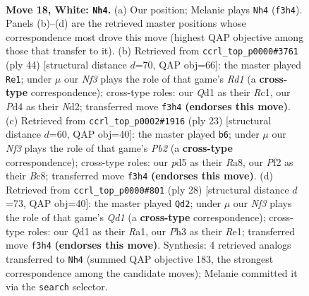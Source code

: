 \documentclass[11pt]{article}
\begin{document}
\clearpage

\begin{figure}[p]\centering
\begin{subfigure}{0.46\textwidth}\centering
\resizebox{\linewidth}{!}{%
\newchessgame
\chessboard[
  setfen={rnq1r1k1/pp1bbppp/4pn2/2Pp4/N2P4/P4N1P/1P1B1PP1/1BRQR1K1 w - - 1 18},
  showmover=false,
  pgfstyle=straightmove, color=movearrow, markmove={f3-h4}
]}
\caption{}
\end{subfigure}\hfill
\begin{subfigure}{0.46\textwidth}\centering
\resizebox{\linewidth}{!}{%
\newchessgame
\chessboard[
  setfen={2r1r1k1/1bqnbpp1/pp1p1n1p/4p3/P3P2P/2N1B1P1/1PPNQPB1/2RR2K1 w - - 9 23},
  showmover=false,
  pgfstyle=straightmove, color=movearrow, markmove={d1-e1}
]}
\caption{}
\end{subfigure}
\\[4pt]
\begin{subfigure}{0.46\textwidth}\centering
\resizebox{\linewidth}{!}{%
\newchessgame
\chessboard[
  setfen={r1bqr1k1/ppn2ppp/2pb1n2/3p4/3P4/P1NBP2P/1PQBNPP1/R4RK1 b - - 2 12},
  showmover=false,
  pgfstyle=straightmove, color=movearrow, markmove={b7-b6}
]}
\caption{}
\end{subfigure}\hfill
\begin{subfigure}{0.46\textwidth}\centering
\resizebox{\linewidth}{!}{%
\newchessgame
\chessboard[
  setfen={r2qr1k1/1p1bbppp/p1pp1nn1/P7/3NP3/2N2P2/BPP2BPP/R2QR1K1 w - - 1 15},
  showmover=false,
  pgfstyle=straightmove, color=movearrow, markmove={d1-d2}
]}
\caption{}
\end{subfigure}
\caption{\textbf{Move 18, White: \texttt{Nh4}.} (a) Our position; Melanie plays \texttt{Nh4} (\texttt{f3h4}). Panels (b)--(d) are the retrieved master positions whose correspondence most drove this move (highest QAP objective among those that transfer to it). (b) Retrieved from \texttt{ccrl\_top\_p0000\#3761} (ply 44) [structural distance $d$=70, QAP obj=66]: the master played \texttt{Re1}; under $\mu$ our \emph{Nf3} plays the role of that game's \emph{Rd1} (a \textbf{cross-type} correspondence); cross-type roles: our \emph{Q}d1 as their \emph{R}c1, our \emph{P}d4 as their \emph{N}d2; transferred move \texttt{f3h4} \textbf{(endorses this move)}. (c) Retrieved from \texttt{ccrl\_top\_p0002\#1916} (ply 23) [structural distance $d$=60, QAP obj=40]: the master played \texttt{b6}; under $\mu$ our \emph{Nf3} plays the role of that game's \emph{Pb2} (a \textbf{cross-type} correspondence); cross-type roles: our \emph{p}d5 as their \emph{R}a8, our \emph{P}f2 as their \emph{B}c8; transferred move \texttt{f3h4} \textbf{(endorses this move)}. (d) Retrieved from \texttt{ccrl\_top\_p0000\#801} (ply 28) [structural distance $d$=73, QAP obj=40]: the master played \texttt{Qd2}; under $\mu$ our \emph{Nf3} plays the role of that game's \emph{Qd1} (a \textbf{cross-type} correspondence); cross-type roles: our \emph{Q}d1 as their \emph{R}a1, our \emph{P}h3 as their \emph{R}e1; transferred move \texttt{f3h4} \textbf{(endorses this move)}. Synthesis: 4 retrieved analogs transferred to \texttt{Nh4} (summed QAP objective 183, the strongest correspondence among the candidate moves); Melanie committed it via the \texttt{search} selector.}

\end{figure}
\end{document}
